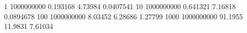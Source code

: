 1 1000000000 0.193168 4.73984 0.0407541
10 1000000000 0.641321 7.16818 0.0894678
100 1000000000 8.03452 6.28686 1.27799
1000 1000000000 91.1955 11.9831 7.61034
